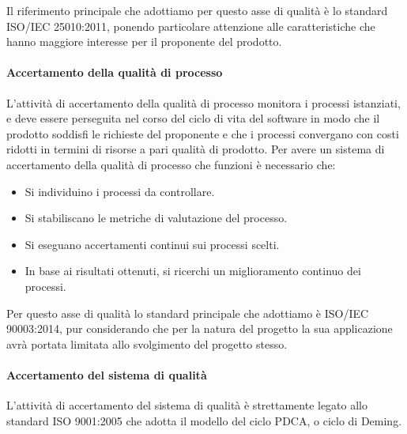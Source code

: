 \documentclass[../../norme-di-progetto.tex]{subfiles}
\begin{document}
Il riferimento principale che adottiamo per questo asse di qualità è lo standard ISO/IEC 25010:2011, ponendo particolare attenzione alle caratteristiche che hanno maggiore interesse per il proponente del prodotto.


\paragraph{Accertamento della qualità di processo}%
\label{par:accertamento_della_qualita_di_processo/attivita}

L'attività di accertamento della qualità di processo monitora i processi istanziati, e deve essere perseguita nel corso del ciclo di vita del software in modo che il prodotto soddisfi le richieste del proponente e che i processi convergano con costi ridotti in termini di risorse a pari qualità di prodotto.
Per avere un sistema di accertamento della qualità di processo che funzioni è necessario che:

\begin{itemize}
  \item Si individuino i processi da controllare.
  \item Si stabiliscano le metriche di valutazione del processo.
  \item Si eseguano accertamenti continui sui processi scelti.
  \item In base ai risultati ottenuti, si ricerchi un miglioramento continuo dei processi.
\end{itemize}

Per questo asse di qualità lo standard principale che adottiamo è ISO/IEC 90003:2014, pur considerando che per la natura del progetto la sua applicazione avrà portata limitata allo svolgimento del progetto stesso.


\paragraph{Accertamento del sistema di qualità}%
\label{par:accertamento_del_sistema_di_qualita}

L'attività di accertamento del sistema di qualità è strettamente legato allo standard ISO 9001:2005 che adotta il modello del ciclo PDCA, o ciclo di Deming.
\end{document}
